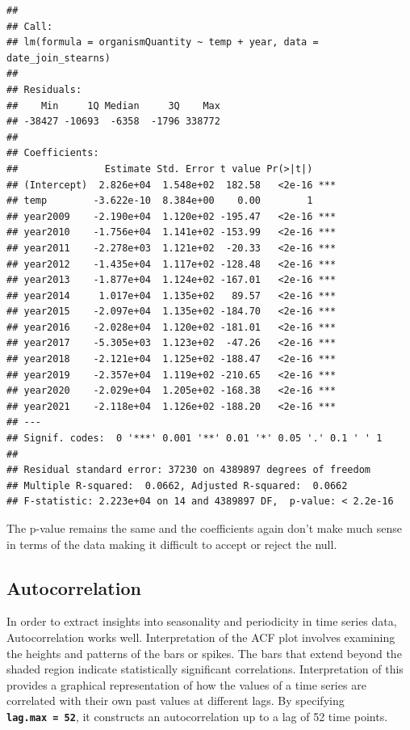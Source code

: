 \documentclass[
]{article}
\begin{document}
\begin{verbatim}
## 
## Call:
## lm(formula = organismQuantity ~ temp + year, data = date_join_stearns)
## 
## Residuals:
##    Min     1Q Median     3Q    Max 
## -38427 -10693  -6358  -1796 338772 
## 
## Coefficients:
##               Estimate Std. Error t value Pr(>|t|)    
## (Intercept)  2.826e+04  1.548e+02  182.58   <2e-16 ***
## temp        -3.622e-10  8.384e+00    0.00        1    
## year2009    -2.190e+04  1.120e+02 -195.47   <2e-16 ***
## year2010    -1.756e+04  1.141e+02 -153.99   <2e-16 ***
## year2011    -2.278e+03  1.121e+02  -20.33   <2e-16 ***
## year2012    -1.435e+04  1.117e+02 -128.48   <2e-16 ***
## year2013    -1.877e+04  1.124e+02 -167.01   <2e-16 ***
## year2014     1.017e+04  1.135e+02   89.57   <2e-16 ***
## year2015    -2.097e+04  1.135e+02 -184.70   <2e-16 ***
## year2016    -2.028e+04  1.120e+02 -181.01   <2e-16 ***
## year2017    -5.305e+03  1.123e+02  -47.26   <2e-16 ***
## year2018    -2.121e+04  1.125e+02 -188.47   <2e-16 ***
## year2019    -2.357e+04  1.119e+02 -210.65   <2e-16 ***
## year2020    -2.029e+04  1.205e+02 -168.38   <2e-16 ***
## year2021    -2.118e+04  1.126e+02 -188.20   <2e-16 ***
## ---
## Signif. codes:  0 '***' 0.001 '**' 0.01 '*' 0.05 '.' 0.1 ' ' 1
## 
## Residual standard error: 37230 on 4389897 degrees of freedom
## Multiple R-squared:  0.0662, Adjusted R-squared:  0.0662 
## F-statistic: 2.223e+04 on 14 and 4389897 DF,  p-value: < 2.2e-16
\end{verbatim}

The p-value remains the same and the coefficients again don't make much
sense in terms of the data making it difficult to accept or reject the
null.

\hypertarget{autocorrelation}{%
\subsection{Autocorrelation}\label{autocorrelation}}

In order to extract insights into seasonality and periodicity in time
series data, Autocorrelation works well. Interpretation of the ACF plot
involves examining the heights and patterns of the bars or spikes. The
bars that extend beyond the shaded region indicate statistically
significant correlations. Interpretation of this provides a graphical
representation of how the values of a time series are correlated with
their own past values at different lags. By specifying
\textbf{\texttt{lag.max\ =\ 52}}, it constructs an autocorrelation up to
a lag of 52 time points.
\end{document}
